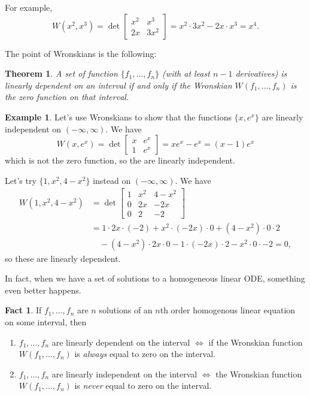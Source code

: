 \documentclass[12pt]{amsart}
\numberwithin{equation}{section}
\theoremstyle{plain} %
\newtheorem{thm}[equation]{Theorem}
\theoremstyle{definition}
\newtheorem{ex}[equation]{Example}
\newtheorem{fact}[equation]{Fact}
\theoremstyle{remark}
\begin{document}
For example, \[W(x^2,x^3) = \det \begin{bmatrix} x^2 & x^3 \\ 2x & 3x^2 \end{bmatrix} = x^2 \cdot 3x^2 - 2x \cdot x^3 = x^4.\]

The point of Wronskians is the following:
\begin{thm} A set of function $\{f_1,\dots,f_n\}$ (with at least $n-1$ derivatives) is linearly dependent on an interval if and only if the Wronskian $W(f_1,\dots,f_n)$ is the  zero function on that interval.
\end{thm}

\begin{ex}
Let's use Wronskians to show that the functions $\{ x, e^x\}$ are linearly independent on $(-\infty,\infty)$. We have
\[ W( x, e^x) = \det \begin{bmatrix} x & e^x \\ 1 & e^x\end{bmatrix} = xe^x - e^x = (x-1) e^x\] which is not the zero function, so the are linearly independent.

Let's try $\{1,  x^2, 4-x^2\}$ instead on $(-\infty,\infty)$. We have
\[\begin{aligned} W(1,  x^2, 4-x^2) &= \det \begin{bmatrix} 1 & x^2 & 4-x^2 \\ 0 & 2x & -2x \\ 0 & 2 & -2 \end{bmatrix} \\& = 1 \cdot 2x \cdot (-2) + x^2 \cdot (-2x) \cdot 0 + (4-x^2) \cdot 0 \cdot 2 \\&\quad - (4-x^2) \cdot 2x \cdot 0 - 1 \cdot (-2x) \cdot 2  - x^2 \cdot 0 \cdot -2 = 0,\end{aligned}\]
so these are linearly dependent.
\end{ex}

In fact, when we have a set of solutions to a homogeneous linear ODE, something even better happens.

\begin{fact}
If $f_1,\dots,f_n$ are $n$ solutions of an $n$th order homogenous linear equation on some interval, then 
\begin{enumerate}
\item $f_1,\dots,f_n$ are linearly dependent on the interval $\Longleftrightarrow$ if the Wronskian function $W(f_1,\dots,f_n)$ is \emph{always} equal to zero on the interval.
\item $f_1,\dots,f_n$ are linearly independent on the interval $\Longleftrightarrow$ the Wronskian function $W(f_1,\dots,f_n)$ is \emph{never} equal to zero on the interval.
\end{enumerate}
\end{fact}
\end{document}
